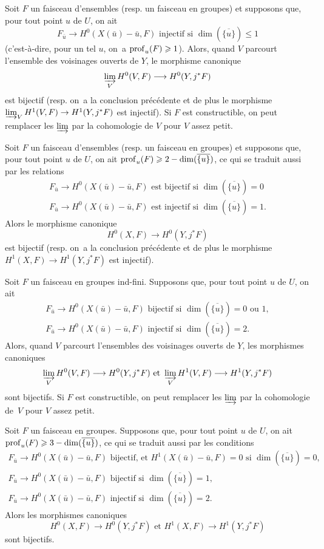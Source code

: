 \begin{enumeratea}
\item
Soit $F$ un faisceau d'ensembles (resp. un faisceau en groupes) et supposons que, pour tout point $u$ de $U$, on ait
$$F_{\bar{u}} \to H^0(X(\bar{u})-\bar{u}, F)\text{ injectif si } \dim(\overline{\{u\}}) \leq 1$$
(c'est-\`a-dire, pour un tel $u$, on~a $\operatorname{prof}_u(F) \geqslant 1$). Alors, quand $V$ parcourt l'ensemble des voisinages ouverts de $Y$, le morphisme canonique
$$
\varinjlim_V H^0(V, F) \to H^0(Y, j^*F)
$$
est bijectif (resp. on~a la conclusion pr\'ec\'edente et de plus le morphisme $\varinjlim_V H^1(V, F) \to H^1(Y, j^* F)$ est injectif). Si $F$ est constructible, on peut remplacer les $\varinjlim$ par la cohomologie de $V$ pour $V$ \og assez petit\fg.
\item
Soit $F$ un faisceau d'ensembles (resp. un faisceau en groupes) et supposons que, pour tout point $u$ de $U$, on ait $\operatorname{prof}_u(F) \geqslant 2 -\dim(\overline{\{u\}})$, ce qui se traduit aussi par les relations
\begin{gather*}
F_{\bar{u}}\to H^0(X(\bar{u})-\bar{u}, F)\text{ est bijectif si } \dim(\overline{\{u\}})=0\\
F_{\bar{u}}\to H^0(X(\bar{u})-\bar{u}, F)\text{ est injectif si } \dim(\overline{\{u\}})=1.
\end{gather*}
Alors le morphisme canonique
$$H^0(X, F) \to H^0(Y, j^*F)$$
est bijectif (resp. on~a la conclusion pr\'ec\'edente et de plus le morphisme $H^1(X, F) \to H^1(Y, j^*F)$ est injectif).
\item
Soit $F$ un faisceau en groupes ind-fini. Supposons que, pour tout point $u$ de $U$, on ait
\begin{gather*}
F_{\bar{u}}\to H^0(X(\bar{u})-\bar{u}, F)\text{ bijectif si } \dim(\overline{\{u\}})=0\text{ ou }1,\\
F_{\bar{u}}\to H^0(X(\bar{u})-\bar{u}, F)\text{ injectif si } \dim(\overline{\{u\}})=2.
\end{gather*}
Alors, quand $V$ parcourt l'ensembles des voisinages ouverts de $Y$, les morphismes canoniques
$$
\varinjlim_V H^0(V, F) \to H^0(Y, j^*F) \text{ et } \varinjlim_V H^1(V, F) \to H^1(Y, j^*F)
$$
sont bijectifs. Si $F$ est constructible, on peut remplacer les $\varinjlim$ par la cohomologie de~$V$ pour $V$ assez petit.
\item
Soit $F$ un faisceau en groupes. Supposons que, pour tout point $u$ de $U$, on ait $\operatorname{prof}_u(F) \geqslant 3-\dim(\overline{\{u\}})$, ce qui se traduit aussi par les conditions
\begin{gather*}
F_{\bar{u}}\to H^0(X(\bar{u})-\bar{u}, F)\text{ bijectif, et } H^1(X(\bar{u})-\bar{u}, F)=0 \text{ si } \dim(\overline{\{u\}})=0,\\
F_{\bar{u}}\to H^0(X(\bar{u})-\bar{u}, F)\text{ bijectif si } \dim(\overline{\{u\}})=1,\\
F_{\bar{u}}\to H^0(X(\bar{u})-\bar{u}, F)\text{ injectif si } \dim(\overline{\{u\}})=2.
\end{gather*}
Alors les morphismes canoniques
$$H^0(X, F) \to H^0(Y, j^*F)\text{ et } H^1(X, F) \to H^1(Y, j^*F)$$
sont bijectifs.
\end{enumeratea}

